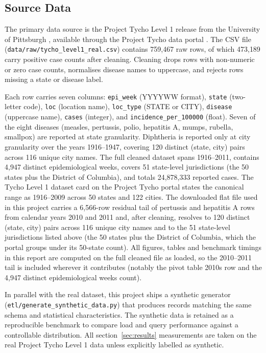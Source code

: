 \documentclass[12pt,a4paper]{article}
\begin{document}
\subsection{Source Data}

The primary data source is the Project Tycho Level 1 release from the University of Pittsburgh \cite{vanpanhuis2013, vanpanhuis2018}, available through the Project Tycho data portal \cite{tychoportal}. The CSV file (\texttt{data/raw/tycho\_level1\_real.csv}) contains 759{,}467 raw rows, of which 473{,}189 carry positive case counts after cleaning. Cleaning drops rows with non-numeric or zero case counts, normalises disease names to uppercase, and rejects rows missing a state or disease label.

Each row carries seven columns: \texttt{epi\_week} (YYYYWW format), \texttt{state} (two-letter code), \texttt{loc} (location name), \texttt{loc\_type} (STATE or CITY), \texttt{disease} (uppercase name), \texttt{cases} (integer), and \texttt{incidence\_per\_100000} (float). Seven of the eight diseases (measles, pertussis, polio, hepatitis A, mumps, rubella, smallpox) are reported at state granularity. Diphtheria is reported only at city granularity over the years 1916--1947, covering 120 distinct (state, city) pairs across 116 unique city names. The full cleaned dataset spans 1916--2011, contains 4{,}947 distinct epidemiological weeks, covers 51 state-level jurisdictions (the 50 states plus the District of Columbia), and totals 24{,}878{,}333 reported cases. The Tycho Level 1 dataset card on the Project Tycho portal states the canonical range as 1916--2009 across 50 states and 122 cities. The downloaded flat file used in this project carries a 6{,}566-row residual tail of pertussis and hepatitis A rows from calendar years 2010 and 2011 and, after cleaning, resolves to 120 distinct (state, city) pairs across 116 unique city names and to the 51 state-level jurisdictions listed above (the 50 states plus the District of Columbia, which the portal groups under its 50-state count). All figures, tables and benchmark timings in this report are computed on the full cleaned file as loaded, so the 2010--2011 tail is included wherever it contributes (notably the pivot table 2010s row and the 4{,}947 distinct epidemiological weeks count).

In parallel with the real dataset, this project ships a synthetic generator (\texttt{etl/generate\_synthetic\_data.py}) that produces records matching the same schema and statistical characteristics. The synthetic data is retained as a reproducible benchmark to compare load and query performance against a controllable distribution. All section~\ref{sec:results} measurements are taken on the real Project Tycho Level 1 data unless explicitly labelled as synthetic.
\end{document}
